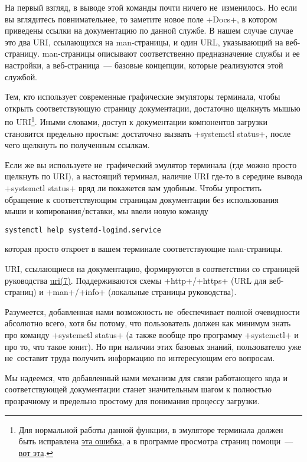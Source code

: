 \documentclass[10pt,oneside,a4paper]{article}
\begin{document}
На первый взгляд, в выводе этой команды почти ничего не~изменилось. Но если вы
вглядитесь повнимательнее, то заметите новое поле +Docs+, в котором приведены
ссылки на документацию по данной службе. В нашем случае случае это два URI,
ссылающихся на man-страницы, и один URL, указывающий на веб-страницу.
man-страницы описывают соответственно предназначение службы и ее настройки, а
веб-страница~--- базовые концепции, которые реализуются этой службой.

Тем, кто использует современные графические эмуляторы терминала, чтобы открыть
соответствующую страницу документации, достаточно щелкнуть мышью по
URI\footnote{Для нормальной работы данной функции, в эмуляторе терминала должен
быть исправлена \href{https://bugzilla.gnome.org/show_bug.cgi?id=676452}{эта
ошибка}, а в программе просмотра страниц помощи~---
\href{https://bugzilla.gnome.org/show_bug.cgi?id=676482}{вот эта}.}. Иными
словами, доступ к документации компонентов загрузки становится предельно
простым: достаточно вызвать +systemctl status+, после чего щелкнуть по
полученным ссылкам.

Если же вы используете не~графический эмулятор терминала (где можно просто
щелкнуть по URI), а настоящий терминал, наличие URI где-то в середине вывода
+systemctl status+ вряд ли покажется вам удобным. Чтобы упростить обращение к
соответствующим страницам документации без использования мыши и
копирования/вставки, мы ввели новую команду
\begin{Verbatim}
systemctl help systemd-logind.service
\end{Verbatim}
которая просто откроет в вашем терминале соответствующие man-страницы.

URI, ссылающиеся на документацию, формируются в соответствии со страницей
руководства
\href{https://www.kernel.org/doc/man-pages/online/pages/man7/url.7.html}{uri(7)}.
Поддерживаются схемы +http+/+https+ (URL для веб-страниц) и +man+/+info+
(локальные страницы руководства).

Разумеется, добавленная нами возможность не~обеспечивает полной очевидности
абсолютно всего, хотя бы потому, что пользователь должен как минимум знать про
команду +systemctl status+ (а также вообще про программу +systemctl+ и про то,
что такое юнит). Но при наличии этих базовых знаний, пользователю уже
не~составит труда получить информацию по интересующим его вопросам.

Мы надеемся, что добавленный нами механизм для связи работающего кода и
соответствующей документации станет значительным шагом к полностью прозрачному и
предельно простому для понимания процессу загрузки.
\end{document}
